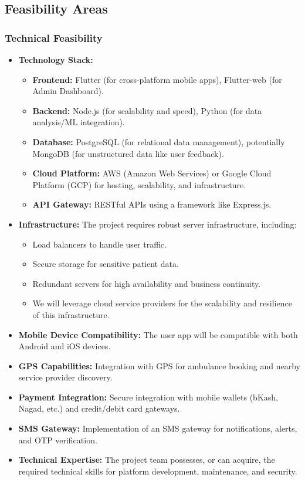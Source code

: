 \documentclass[12pt]{article}
\begin{document}
\subsection{Feasibility Areas}

\subsubsection{Technical Feasibility}
\begin{itemize}
    \item \textbf{Technology Stack:}
    \begin{itemize}
        \item \textbf{Frontend:} Flutter (for cross-platform mobile apps), Flutter-web (for Admin Dashboard).
        \item \textbf{Backend:} Node.js (for scalability and speed), Python (for data analysis/ML integration).
        \item \textbf{Database:} PostgreSQL (for relational data management), potentially MongoDB (for unstructured data like user feedback).
        \item \textbf{Cloud Platform:} AWS (Amazon Web Services) or Google Cloud Platform (GCP) for hosting, scalability, and infrastructure.
        \item \textbf{API Gateway:} RESTful APIs using a framework like Express.js.
    \end{itemize}
    \newpage
    \item \textbf{Infrastructure:} The project requires robust server infrastructure, including:
    \begin{itemize}
    \item Load balancers to handle user traffic.
        \item Secure storage for sensitive patient data.
        \item Redundant servers for high availability and business continuity.
        \item We will leverage cloud service providers for the scalability and resilience of this infrastructure.
    \end{itemize}
     \item \textbf{Mobile Device Compatibility:} The user app will be compatible with both Android and iOS devices.
     \item \textbf{GPS Capabilities:} Integration with GPS for ambulance booking and nearby service provider discovery.
     \item \textbf{Payment Integration:} Secure integration with mobile wallets (bKash, Nagad, etc.) and credit/debit card gateways.
    \item \textbf{SMS Gateway:} Implementation of an SMS gateway for notifications, alerts, and OTP verification.
     \item \textbf{Technical Expertise:} The project team possesses, or can acquire, the required technical skills for platform development, maintenance, and security.
\end{itemize}
\end{document}
